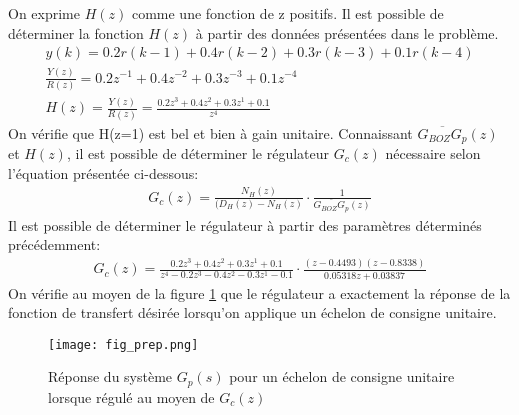 On exprime $H(z)$ comme une fonction de z positifs. Il est possible de déterminer la fonction $H(z)$ à partir des données présentées dans le problème.
\begin{gather}
y(k) = 0.2r(k-1) + 0.4 r(k-2) + 0.3r(k-3) + 0.1r(k-4)\\
\frac{Y(z)}{R(z)} = 0.2z^{-1} + 0.4z^{-2} + 0.3z^{-3} + 0.1z^{-4}\\
H(z) = \frac{Y(z)}{R(z)} = \frac{0.2z^{3} + 0.4z^{2} + 0.3z^{1} + 0.1}{z^4}
\end{gather}
On vérifie que H(z=1) est bel et bien à gain unitaire.
Connaissant $\overline{G_{BOZ}G_p}(z)$ et $H(z)$, il est possible de déterminer le régulateur $G_c(z)$ nécessaire selon l'équation présentée ci-dessous:
\begin{gather}
G_c(z) = \frac{N_H(z)}{(D_H(z) - N_H(z)}\cdot \frac{1}{\overline{G_{BOZ}G_p}(z)}
\end{gather}
Il est possible de déterminer le régulateur à partir des paramètres déterminés précédemment:
\begin{gather}
G_c(z) = \frac{0.2z^{3} + 0.4z^{2} + 0.3z^{1} + 0.1}{z^4 - 0.2z^{3} - 0.4z^{2} - 0.3z^{1} - 0.1}\cdot \frac{(z-0.4493)(z-0.8338)}{0.05318z + 0.03837}
\end{gather}
On vérifie au moyen de la figure \ref{fig1} que le régulateur a exactement la réponse de la fonction de transfert désirée lorsqu'on applique un échelon de consigne unitaire.

\begin{figure}
\centering
\texttt{[image: fig\_prep.png]}
\caption{Réponse du système $G_p(s)$ pour un échelon de consigne unitaire lorsque régulé au moyen de $G_c(z)$}
\label{fig1}
\end{figure}
